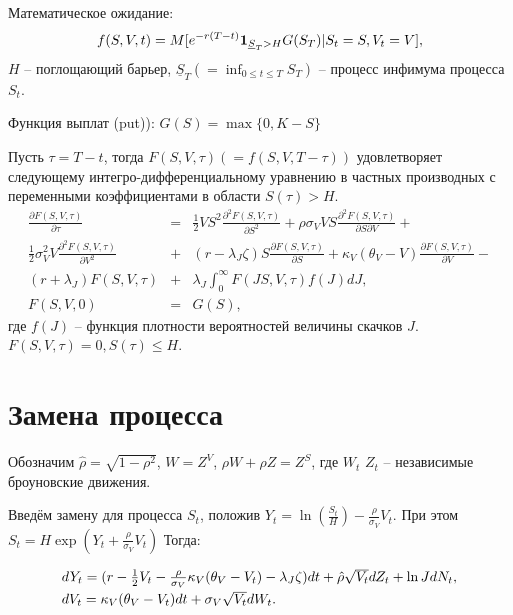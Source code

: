 \documentclass[draft, 12pt]{article}
\begin{document}
Математическое ожидание:
\begin{equation}
f(S,V,t) = M[e^{-r(T-t)}  {\bf 1}_{\underline{S}_T>H} G(S_T) | S_t = S, V_t = V],
\end{equation}
$H$ -- поглощающий барьер, $\underline{S}_T (= \inf_{0\le t\le T}S_T)$ -- процесс инфимума процесса $S_t$. 

Функция выплат (put)):
$G(S)=\max\{0, K - S\}$

Пусть $\tau = T-t$, тогда $F(S,V,\tau)\left(=f(S,V, T-\tau)\right)$ удовлетворяет следующему интегро-дифференциальному уравнению в частных производных с переменными коэффициентами в области $S(\tau) > H$.
\begin{eqnarray*}
		\frac{\partial F(S,V,\tau)}{\partial \tau} &= &
		\frac{1}{2} VS^2 \frac{\partial^2 F(S,V,\tau)}{\partial S^2} +
		\rho\sigma_V VS \frac{\partial^2 F(S,V,\tau)}{\partial S \partial V} +
		\\
		\frac{1}{2} \sigma_V^2 V \frac{\partial^2 F(S,V,\tau)}{\partial V^2} &+&
		(r - \lambda_J \zeta) S \frac{\partial F(S,V,\tau)}{\partial S} +
		\kappa_V(\theta_V - V) \frac{\partial F(S,V,\tau)}{\partial V} - 
		\\
		(r+\lambda_J)F(S,V,\tau) &+&
		\lambda_J \int_0^\infty F(JS,V,\tau) f(J) dJ,
		\\
		F(S,V,0) &=& G(S),
\end{eqnarray*}
где $f(J)$ -- функция плотности вероятностей величины скачков $J$. $F(S,V,\tau) = 0,  S(\tau) \le H$.

\section{Замена процесса}

Обозначим $\hat{\rho} = \sqrt{1-\rho^2}$, $W = Z^V$, $\rho W + \hat{\rho}Z = Z^S$, где $W_t$ $Z_t$ -- независимые броуновские движения. 

Введём замену для процесса $S_t$, положив $Y_t = \ln(\frac{S_t}{H}) - \frac{\rho}{\sigma_V}V_t$. При этом $S_t = H\exp(Y_t + \frac{\rho}{\sigma_V}V_t) $  Тогда:

\begin{equation*}
\begin{array}{l}
d Y_t = (r-\frac{1}{2}V_t - \frac{\rho}{\sigma_V}\kappa_V(\theta_V - V_t) - \lambda_J \zeta)dt+\hat{\rho}\sqrt{V_t} dZ_t+\ln JdN_t,
\smallskip\\
dV_t= \kappa_V(\theta_V-V_t)dt+\sigma_V\sqrt{V_t}dW_t.
\smallskip\\
\end{array}
\end{equation*}
\end{document}
